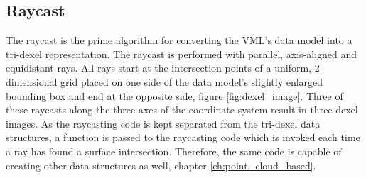 \subsection{Raycast}
\label{sec:tri_dexel_raycast}

The raycast is the prime algorithm for converting the VML's data model into a tri-dexel representation.
The raycast is performed with parallel, axis-aligned and equidistant rays.
All rays start at the intersection points of a uniform, 2-dimensional grid placed on one side of the data model's slightly enlarged bounding box and end at the opposite side, \cf figure \ref{fig:dexel_image}.
Three of these raycasts along the three axes of the coordinate system result in three dexel images.
As the raycasting code is kept separated from the tri-dexel data structures, a function is passed to the raycasting code which is invoked each time a ray has found a surface intersection.
Therefore, the same code is capable of creating other data structures as well, \cf chapter \ref{ch:point_cloud_based}.

